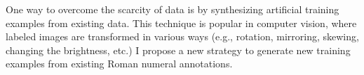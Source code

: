 
One way to overcome the scarcity of data is by synthesizing
artificial training examples from existing data. This
technique is popular in computer vision, where labeled
images are transformed in various ways (e.g., rotation,
mirroring, skewing, changing the brightness, etc.) I propose
a new strategy to generate new training examples from
existing Roman numeral annotations.
